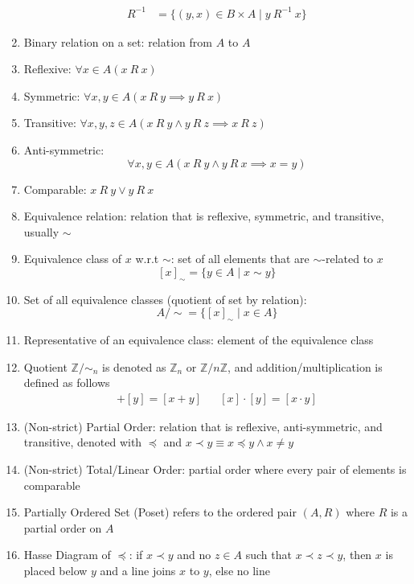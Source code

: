 \documentclass[landscape, a4paper]{article}
\newcommand{\Z}{\mathbb{Z}}
\newcommand{\Or}{\vee}
\renewcommand{\and}{\wedge}
\begin{document}
\begin{multicols*}{4}
\begin{enumerate}[wide, labelindent=2pt]
\begin{align*}
                  R^{-1} & = \{(y,x)\in B\times A \mid y\ R^{-1}\ x\}
              \end{align*}
        \item Binary relation on a set: relation from $A$ to $A$
        \item Reflexive: $\forall x\in A(x\ R\ x)$
        \item Symmetric: $\forall x,y\in A(x\ R\ y\implies y\ R\ x)$
        \item Transitive: $\forall x,y,z\in A(x\ R\ y \and y\ R\ z \implies x\ R\ z)$
        \item Anti-symmetric:
              \[
                  \forall x,y\in A \left(x\ R\ y\and y\ R\ x\implies x=y\right)
              \]
        \item Comparable: $x\ R\ y \Or y\ R\ x$
        \item Equivalence relation: relation that is reflexive, symmetric, and transitive, usually ${\sim}$
        \item Equivalence class of $x$ w.r.t ${\sim}$: set of all elements that are ${\sim}$-related to $x$
              \[
                  [x]_{\sim}=\{y\in A\mid x{\sim} y\}
              \]
        \item Set of all equivalence classes (quotient of set by relation):
              \[
                  A/{\sim} =\{[x]_{\sim}\mid x\in A\}
              \]
        \item Representative of an equivalence class: element of the equivalence class
        \item Quotient $\Z/{\sim}_n$ is denoted as $\Z_n$ or $\Z/n\Z$, and addition/multiplication is defined as follows
              \begin{align*}
                  [x]+[y]=[x+y] &  & [x]\cdot[y]=[x\cdot y]
              \end{align*}
        \item (Non-strict) Partial Order: relation that is reflexive, anti-symmetric, and transitive, denoted with $\preccurlyeq$ and $x\prec y\equiv x\preccurlyeq y \and x\neq y$
        \item (Non-strict) Total/Linear Order: partial order where every pair of elements is comparable
        \item Partially Ordered Set (Poset) refers to the ordered pair $(A, R)$ where $R$ is a partial order on $A$
        \item Hasse Diagram of $\preccurlyeq$: if $x\prec y$ and no $z\in A$ such that $x\prec z\prec y$, then $x$ is placed below $y$ and a line joins $x$ to $y$, else no line

\end{enumerate}
\end{multicols*}
\end{document}
